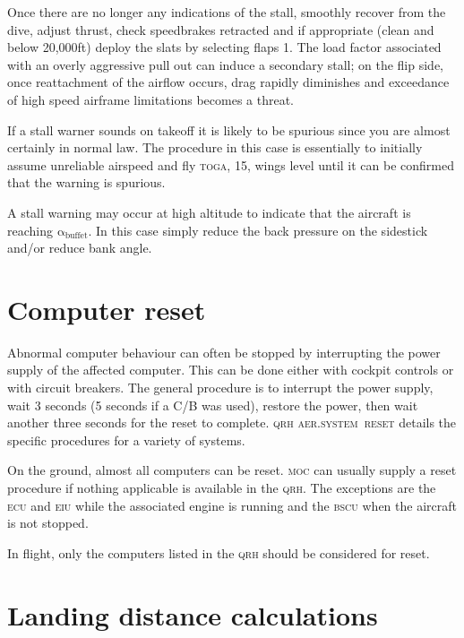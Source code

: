 \documentclass[a5paper,11pt,twoside]{book}
\newcommand{\ac}[1]{{\scshape\MakeLowercase{#1}}}
\newcommand{\inlcite}[1]{{\ac{#1}}}
\newcommand{\multicite}[1]{%
  \nopagebreak
  \noindent{{\color{blue}\footnotesize[\inlcite{#1}]}}
}
\begin{document}
Once there are no longer any indications of the stall, smoothly recover from the
dive, adjust thrust, check speedbrakes retracted and if appropriate (clean and
below 20,000ft) deploy the slats by selecting flaps 1. The load factor
associated with an overly aggressive pull out can induce a secondary stall; on
the flip side, once reattachment of the airflow occurs, drag rapidly diminishes
and exceedance of high speed airframe limitations becomes a threat.

If a stall warner sounds on takeoff it is likely to be spurious since you are
almost certainly in normal law. The procedure in this case is essentially to
initially assume unreliable airspeed and fly \ac{TOGA}, 15\textdegree , wings level
until it can be confirmed that the warning is spurious.

A stall warning may occur at high altitude to indicate that the aircraft is
reaching $\mathrm{\alpha_{buffet}}$. In this case simply reduce the back
pressure on the sidestick and/or reduce bank angle.

\multicite{FCOM~PRO.AER.MISC}


\section{Computer reset}

Abnormal computer behaviour can often be stopped by interrupting the power
supply of the affected computer. This can be done either with cockpit controls
or with circuit breakers. The general procedure is to interrupt the power
supply, wait 3 seconds (5 seconds if a C/B was used), restore the power, then
wait another three seconds for the reset to complete. \inlcite{QRH
  AER.SYSTEM~RESET} details the specific procedures for a variety of systems.

On the ground, almost all computers can be reset. \ac{MOC} can usually supply a
reset procedure if nothing applicable is available in the \ac{QRH}. The
exceptions are the \ac{ECU} and \ac{EIU} while the associated engine is running
and the \ac{BSCU} when the aircraft is not stopped.

In flight, only the computers listed in the \ac{QRH} should be considered for
reset.

\multicite{QRH~AER.SYSTEM~RESET}

\section{Landing distance calculations}
\end{document}
